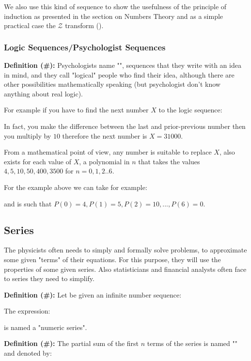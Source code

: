 We also use this kind of sequence to show the usefulness of the principle of induction as presented in the section on Numbers Theory and as a simple practical case the $\mathcal{Z}$ transform ().

	\subsubsection{Logic Sequences/Psychologist Sequences}
	\textbf{Definition (\#\mydef):} Psychologists name "", sequences that they write with an idea in mind, and they call "logical" people who find their idea, although there are other possibilities mathematically speaking (but psychologist don't know anything about real logic).
	
	For example if you have to find the next number $X$ to the logic sequence:
	
	In fact, you make the difference between the last and prior-previous number then you multiply by $10$ therefore the next number is $X=31000$.
	
	From a mathematical point of view, any number is suitable to replace $X$, also exists for each value of $X$, a polynomial in $n$ that takes the values $4, 5, 10, 50, 400, 3500$ for $n = 0, 1 , 2 ..6$.
	
	For the example above we can take for example:
	
	and is such that $P(0)=4, P(1)=5, P(2)=10, ...,P(6)=0$.

	\pagebreak
	\subsection{Series}

The physicists often needs to simply and formally solve problems, to approximate some given "terms" of their equations. For this purpose, they will use the properties of some given series. Also statisticians and financial analysts often face to series they need to simplify.

\textbf{Definition (\#\mydef):} Let be given an infinite number sequence:
	
	The expression:
	
	is named a "numeric series".
	
	\textbf{Definition (\#\mydef):} The partial sum of the first $n$ terms of the series is named "\label{partial sum}" and denoted by:
	
